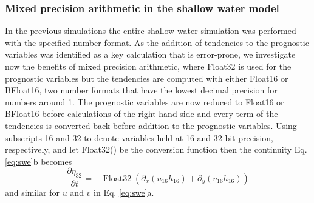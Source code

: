 \documentclass[draft]{agujournal2019}
\newcommand{\op}{\operatorname}
\begin{document}
\subsubsection{Mixed precision arithmetic in the shallow water model}
\label{sec:mixed}

In the previous simulations the entire shallow water simulation was performed with the specified number format. As the addition of tendencies to the prognostic variables was identified as a key calculation that is error-prone, we investigate now the benefits of mixed precision arithmetic, where Float32 is used for the prognostic variables but the tendencies are computed with either Float16 or BFloat16, two number formats that have the lowest decimal precision for numbers around 1. The prognostic variables are now reduced to Float16 or BFloat16 before calculations of the right-hand side and every term of the tendencies is converted back before addition to the prognostic variables. Using subscripts 16 and 32 to denote variables held at 16 and 32-bit precision, respectively, and let Float32() be the conversion function then the continuity Eq. \ref{eq:swe}b becomes
\begin{equation}
\frac{\partial \eta_{32}}{\partial t} = -\op{Float32}( \partial_x(u_{16}h_{16}) + \partial_y(v_{16}h_{16} ))
\label{eq:conversion}
\end{equation}
and similar for $u$ and $v$ in Eq. \ref{eq:swe}a.
\end{document}
